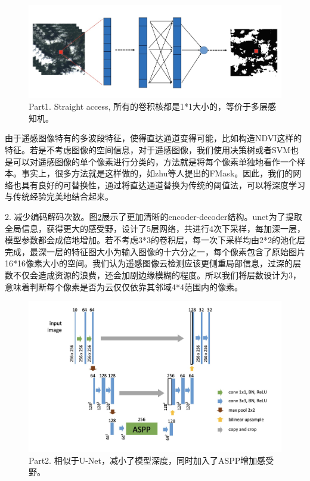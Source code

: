 \documentclass[UTF8]{ctexart}
\begin{document}
\begin{figure}[H]
    \centering
    \includegraphics[scale=0.25]{../pic/part1.jpg}
    \caption[]{Part1. Straight access, 所有的卷积核都是1*1大小的，等价于多层感知机。}
    \label{pic:straight}
\end{figure}

由于遥感图像特有的多波段特征，使得直达通道变得可能，比如构造NDVI这样的特征。若是不考虑图像的空间信息，对于遥感图像，我们使用决策树或者SVM也是可以对遥感图像的单个像素进行分类的，方法就是将每个像素单独地看作一个样本。事实上，很多方法就是这样做的，如zhu等人提出的FMask\cite{zhu2012object}。因此，我们的网络也具有良好的可替换性，通过将直达通道替换为传统的阈值法，可以将深度学习与传统经验完美地结合起来。

2. 减少编码解码次数。图\ref{pic:part2}展示了更加清晰的encoder-decoder结构。unet为了提取全局信息，获得更大的感受野，设计了5层网络，共进行4次下采样，每加深一层，模型参数都会成倍地增加。若不考虑3*3的卷积层，每一次下采样均由2*2的池化层完成，最深一层的特征图大小为输入图像的十六分之一，每个像素包含了原始图片16*16像素大小的空间。我们认为遥感图像云检测应该更侧重局部信息，过深的层数不仅会造成资源的浪费，还会加剧边缘模糊的程度。所以我们将层数设计为3，意味着判断每个像素是否为云仅仅依靠其邻域4*4范围内的像素。

\begin{figure}[H]
    \centering
    \includegraphics[scale=0.25]{../pic/part2.jpg}
    \caption[]{Part2. 相似于U-Net，减小了模型深度，同时加入了ASPP增加感受野。}
    \label{pic:part2}
\end{figure}
\end{document}
